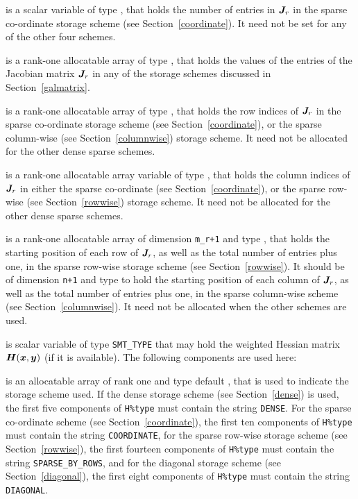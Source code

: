 \documentclass{galahad}
\begin{document}
\begin{description}
\begin{description}
 is a scalar variable of type \integer, that
holds the number of entries in ${\bm{J}}_r$
in the sparse co-ordinate storage scheme (see Section~\ref{coordinate}).
It need not be set for any of the other four schemes.

 is a rank-one allocatable array of type \realdp, that holds
the values of the entries of the Jacobian matrix ${\bm{J}}_r$ in any of the
storage schemes discussed in Section~\ref{galmatrix}.

 is a rank-one allocatable array of type \integer,
that holds the row indices of ${\bm{J}}_r$ in the sparse co-ordinate storage
scheme (see Section~\ref{coordinate}), or the sparse column-wise
(see Section~\ref{columnwise}) storage scheme.
It need not be allocated for the other dense sparse schemes.

 is a rank-one allocatable array variable of type \integer,
that holds the column indices of ${\bm{J}}_r$ in either the sparse co-ordinate
(see Section~\ref{coordinate}), or the sparse row-wise
(see Section~\ref{rowwise}) storage scheme.
It need not be allocated for the other dense sparse schemes.

 is a rank-one allocatable array of dimension {\tt m\_r+1} and type
\integer, that holds the starting position of each row of ${\bm{J}}_r$, as well
as the total number of entries plus one, in the sparse row-wise storage
scheme (see Section~\ref{rowwise}). It should be of dimension {\tt n+1} and type
\integer to hold the starting position of each column of ${\bm{J}}_r$, as well
as the total number of entries plus one, in the sparse column-wise scheme
(see Section~\ref{columnwise}). It need not be allocated when the
other schemes are used.

\end{description}

 is scalar variable of type {\tt SMT\_TYPE} that may hold the
weighted Hessian matrix ${\bm{H}}({\bm{x}},{\bm{y}})$ (if it is available).
The following components are used here:

\begin{description}

 is an allocatable array of rank one and type default
\character, that
is used to indicate the storage scheme used. If the dense storage scheme
(see Section~\ref{dense}) is used,
the first five components of {\tt H\%type} must contain the
string {\tt DENSE}.
For the sparse co-ordinate scheme (see Section~\ref{coordinate}),
the first ten components of {\tt H\%type} must contain the
string {\tt COORDINATE},
for the sparse row-wise storage scheme (see Section~\ref{rowwise}),
the first fourteen components of {\tt H\%type} must contain the
string {\tt SPARSE\_BY\_ROWS},
and for the diagonal storage scheme (see Section~\ref{diagonal}),
the first eight components of {\tt H\%type} must contain the
string {\tt DIAGONAL}.


\end{description}
\end{description}
\end{document}
